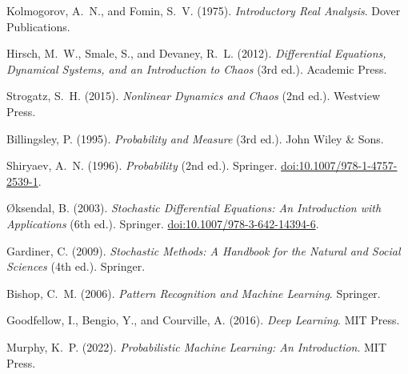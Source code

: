 \begin{enumerate}[label={\textup{[\arabic*]}},ref=\arabic*,leftmargin=*,itemsep=0.5em]
\item \label{ref:kolmogorov}
Kolmogorov, A.~N., and Fomin, S.~V. (1975). \emph{Introductory Real Analysis}. Dover Publications.

\item \label{ref:hirsch-smale}
Hirsch, M.~W., Smale, S., and Devaney, R.~L. (2012). \emph{Differential Equations, Dynamical Systems, and an Introduction to Chaos} (3rd ed.). Academic Press.

\item \label{ref:strogatz}
Strogatz, S.~H. (2015). \emph{Nonlinear Dynamics and Chaos} (2nd ed.). Westview Press.

\item \label{ref:billingsley}
Billingsley, P. (1995). \emph{Probability and Measure} (3rd ed.). John Wiley \& Sons.

\item \label{ref:shiryaev}
Shiryaev, A.~N. (1996). \emph{Probability} (2nd ed.). Springer. \href{https://doi.org/10.1007/978-1-4757-2539-1}{doi:10.1007/978-1-4757-2539-1}.

\item \label{ref:oksendal}
Øksendal, B. (2003). \emph{Stochastic Differential Equations: An Introduction with Applications} (6th ed.). Springer. \href{https://doi.org/10.1007/978-3-642-14394-6}{doi:10.1007/978-3-642-14394-6}.

\item \label{ref:gardiner}
Gardiner, C. (2009). \emph{Stochastic Methods: A Handbook for the Natural and Social Sciences} (4th ed.). Springer.

\item \label{ref:bishop}
Bishop, C.~M. (2006). \emph{Pattern Recognition and Machine Learning}. Springer.

\item \label{ref:goodfellow}
Goodfellow, I., Bengio, Y., and Courville, A. (2016). \emph{Deep Learning}. MIT Press.

\item \label{ref:murphy}
Murphy, K.~P. (2022). \emph{Probabilistic Machine Learning: An Introduction}. MIT Press.
\end{enumerate}